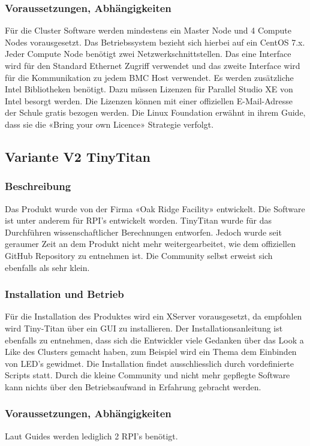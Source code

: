 \subsubsection{Voraussetzungen, Abhängigkeiten}
Für die Cluster Software werden mindestens ein Master Node und 4 Compute Nodes vorausgesetzt. Das Betriebssystem bezieht sich hierbei auf ein CentOS 7.x. Jeder Compute Node benötigt zwei Netzwerkschnittstellen. Das eine Interface wird für den Standard Ethernet Zugriff verwendet und das zweite Interface wird für die Kommunikation zu jedem BMC Host verwendet. Es werden zusätzliche Intel Bibliotheken benötigt. Dazu müssen Lizenzen für Parallel Studio XE von Intel besorgt werden. Die Lizenzen können mit einer offiziellen E-Mail-Adresse der Schule gratis bezogen werden. Die Linux Foundation erwähnt in ihrem Guide, dass sie die «Bring your own Licence» Strategie verfolgt.

\subsection{Variante V2 \flqq TinyTitan\frqq}
\subsubsection{Beschreibung}
Das Produkt wurde von der Firma «Oak Ridge Facility» entwickelt. Die Software ist unter anderem für RPI’s entwickelt worden. TinyTitan wurde für das Durchführen wissenschaftlicher Berechnungen entworfen. Jedoch wurde seit geraumer Zeit an dem Produkt nicht mehr weitergearbeitet, wie dem offiziellen GitHub Repository zu entnehmen ist. Die Community selbst erweist sich ebenfalls als sehr klein. 

\subsubsection{Installation und Betrieb}
Für die Installation des Produktes wird ein XServer vorausgesetzt, da empfohlen wird Tiny-Titan über ein GUI zu installieren. Der Installationsanleitung ist ebenfalls zu entnehmen, dass sich die Entwickler viele Gedanken über das Look a Like des Clusters gemacht haben, zum Beispiel wird ein Thema dem Einbinden von LED’s gewidmet. Die Installation findet ausschliesslich durch vordefinierte Scripts statt. Durch die kleine Community und nicht mehr gepflegte Software kann nichts über den Betriebsaufwand in Erfahrung gebracht werden.

\subsubsection{Voraussetzungen, Abhängigkeiten}
Laut Guides werden lediglich 2 RPI’s benötigt.

